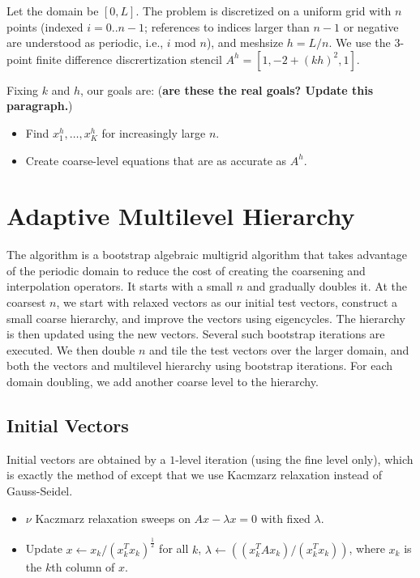 \documentclass{article}
\begin{document}
Let the domain be $[0,L]$. The problem is discretized on a uniform grid with $n$ points (indexed $i = 0..n-1$; references to indices larger than $n - 1$ or negative are understood as periodic, i.e., $i \text{ mod } n$), and meshsize $h = L/n$. We use the 3-point finite difference discrertization stencil $A^h = [1, -2 + (kh)^2, 1]$.

Fixing $k$ and $h$, our goals are: (\textbf{are these the real goals? Update this paragraph.})
\begin{itemize}
	\item Find $x^h_1,\dots,x^h_K$ for increasingly large $n$.
	\item Create coarse-level equations that are as accurate as $A^h$.
\end{itemize}

\section{Adaptive Multilevel Hierarchy}
The algorithm is a bootstrap algebraic multigrid algorithm that takes advantage of the periodic domain to reduce the cost of creating the coarsening and interpolation operators. It starts with a small $n$ and gradually doubles it. At the coarsest $n$, we start with relaxed vectors as our initial test vectors, construct a small coarse hierarchy, and improve the vectors using eigencycles. The hierarchy is then updated using the new vectors. Several such bootstrap iterations are executed. We then double $n$ and tile the test vectors over the larger domain, and both the vectors and multilevel hierarchy using bootstrap iterations. For each domain doubling, we add another coarse level to the hierarchy.

\subsection{Initial Vectors}
Initial vectors are obtained by a $1$-level iteration (using the fine level only), which is exactly the method of \cite{mg_eigen} except that we use Kacmzarz relaxation instead of Gauss-Seidel.
\begin{itemize}
	\item $\nu$ Kaczmarz relaxation sweeps on $A x - \lambda x = 0$ with fixed $\lambda$.
	\item Update $x \longleftarrow x_k / (x_k^T x_k)^{\frac12}$ for all $k$, $\lambda \longleftarrow ((x_k^T A x_k)/(x_k^T x_k))$, where $x_k$ is the $k$th column of $x$.
\end{itemize}
\end{document}
